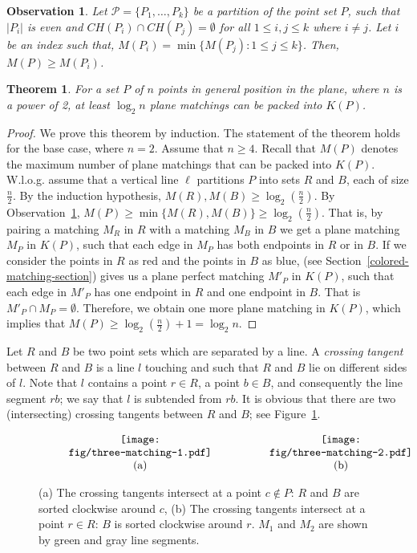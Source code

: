 \documentclass[11pt,a4paper]{article}
\newcommand{\CH}[1]{\text{$CH(#1)$}}
\newcommand{\Cut}[2]{\text{\sf Cut$(#1,#2)$}}
\newcommand{\Kn}[1]{K#1}
\newtheorem{theorem}{Theorem}
\newtheorem{observation}{Observation}
\begin{document}
\begin{observation}
\label{partition-obs}
 Let $\mathcal{P}=\{P_1,\dots, P_k\}$ be a partition of the point set $P$, such that $|P_i|$ is even and $\CH{P_i}\cap\CH{P_j}=\emptyset$ for all $1\le i,j\le k$ where $i\neq j$. Let $i$ be an index such that, $M(P_i)=\min\{M(P_j):1\le j\le k\}$. Then, $M(P)\ge M(P_i)$.
\end{observation}

\begin{theorem}
\label{n-power2}
For a set $P$ of $n$ points in general position in the plane, where $n$ is a power of 2, at least $\log_2{n}$ plane matchings can be packed into $\Kn{(P)}$.
\end{theorem}
\begin{proof}
We prove this theorem by induction. The statement of the theorem holds for the base case, where $n=2$. Assume that $n\ge 4$. Recall that $M(P)$ denotes the maximum number of plane matchings that can be packed into $\Kn{(P)}$. W.l.o.g. assume that a vertical line $\ell$ partitions $P$ into sets $R$ and $B$, each of size $\frac{n}{2}$. By the induction hypothesis, $M(R),M(B)\ge\log_2{(\frac{n}{2})}$. By Observation~\ref{partition-obs}, $M(P)\ge \min\{M(R),M(B)\}\ge\log_2{(\frac{n}{2})}$. That is, by pairing a matching $M_R$ in $R$ with a matching $M_B$ in $B$ we get a plane matching $M_P$ in $\Kn{(P)}$, such that each edge in $M_P$ has both endpoints in $R$ or in $B$. If we consider the points in $R$ as red and the points in $B$ as blue, \Cut{R}{B} (see Section~\ref{colored-matching-section}) gives us a plane perfect matching $M'_P$ in $\Kn{(P)}$, such that each edge in $M'_P$ has one endpoint in $R$ and one endpoint in $B$. That is $M'_P\cap M_P=\emptyset$. Therefore, we obtain one more plane matching in $\Kn{(P)}$, which implies that $M(P)\ge \log_2{(\frac{n}{2})}+1=\log_2n$.
\end{proof}

Let $R$ and $B$ be two point sets which are separated by a line. A {\em crossing tangent} between $R$ and $B$ is a line $l$ touching \CH{R} and \CH{B} such that $R$ and $B$ lie on different sides of $l$. Note that $l$ contains a point $r\in R$, a point $b\in B$, and consequently the line segment $rb$; we say that $l$ is subtended from $rb$. It is obvious that there are two (intersecting) crossing tangents between $R$ and $B$; see Figure~\ref{three-matching-fig}. 

\begin{figure}[htb]
  \centering
\setlength{\tabcolsep}{0in}
  $\begin{tabular}{cc}
\multicolumn{1}{m{.5\columnwidth}}{\centering\texttt{[image: fig/three-matching-1.pdf]}}
&\multicolumn{1}{m{.5\columnwidth}}{\centering\texttt{[image: fig/three-matching-2.pdf]}} \\
(a) & (b)
\end{tabular}$
  \caption{(a) The crossing tangents intersect at a point $c\notin P$: $R$ and $B$ are sorted clockwise around $c$, (b) The crossing tangents intersect at a point $r\in R$: $B$ is sorted clockwise around $r$. $M_1$ and $M_2$ are shown by green and gray line segments.}
\label{three-matching-fig}
\end{figure}
\end{document}
